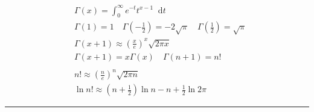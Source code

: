 \documentclass[a4paper,11pt]{article}
\newcommand*\dif{\mathop{}\!\mathrm{d}}
\begin{document}
\begin{align*}
  & \Gamma(x) = \int_{0}^{\infty} e^{-t} t^{x-1} \dif t
\\& \Gamma(1)=1  \quad  \Gamma(-\tfrac12)=-2\sqrt\pi \quad \Gamma(\tfrac12)=\sqrt\pi
\\& \Gamma(x+1) \approx \left(\frac{x}{e}\right)^x\sqrt{2\pi x}
\\& \Gamma(x+1)=x\Gamma(x)  \quad  \Gamma(n+1)=n!
\\
\\& n! \approx \left(\frac{n}{e} \right)^n \sqrt{2\pi n}
\\& \ln n! \approx \left(n + \tfrac12 \right) \ln{n} - n + \tfrac12 \ln{2\pi}
\end{align*}


\rule{\textwidth}{2pt}
\end{document}
